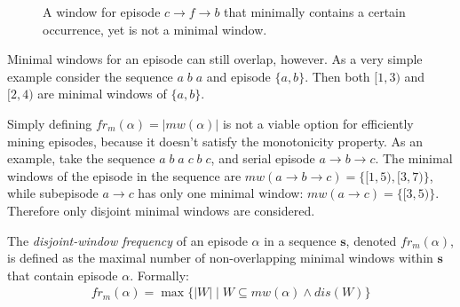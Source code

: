 \begin{figure}
\centering


\caption{A window for episode $ c \to f \to b $ that minimally contains a certain occurrence, yet is not a minimal window.}
\label{fig:mwi-non-minimal-window}
\end{figure}

Minimal windows for an episode can still overlap, however. As a very simple example consider the sequence $ a\;b\;a $ and episode $ \{ a, b \} $. Then both $ [1, 3) $ and $ [2, 4) $ are minimal windows of $ \{ a, b \} $.

Simply defining $ fr_m(\alpha) = | mw(\alpha) | $ is not a viable option for efficiently mining episodes, because it doesn't satisfy the monotonicity property. As an example, take the sequence $ a\;b\;a\;c\;b\;c $, and serial episode $ a \to b \to c $. The minimal windows of the episode in the sequence are $ mw(a \to b \to c) = \{ [1, 5), [3, 7) \} $, while subepisode $ a \to c $ has only one minimal window: $ mw(a \to c) = \{ [3, 5) \} $. Therefore only disjoint minimal windows are considered.

\begin{definition}
The \emph{disjoint-window frequency} of an episode $ \alpha $ in a sequence $ \boldsymbol{s} $, denoted $ fr_m(\alpha) $, is defined as the maximal number of non-overlapping minimal windows within $ \boldsymbol{s} $ that contain episode $ \alpha $. Formally:
\begin{align*}
fr_m(\alpha) = \max\{ | W | \mid W \subseteq mw(\alpha) \wedge dis(W) \}
\end{align*}
\end{definition}

